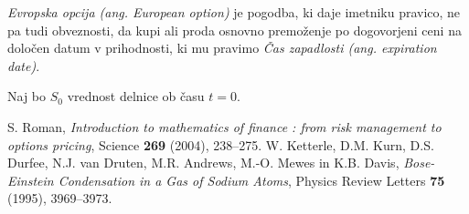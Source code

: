 \documentclass[twoside,11pt]{article}
\begin{document}
    \begin{definicija}
        \textit{Evropska opcija (ang. European option)} je pogodba, ki daje imetniku pravico, ne pa tudi obveznosti, da kupi ali proda osnovno premoženje po dogovorjeni ceni na določen datum v prihodnosti, ki mu pravimo \textit{Čas zapadlosti (ang. expiration date)}.
    \end{definicija}

    \begin{zgled}
        Naj bo $S_0$ vrednost delnice ob času $t=0$. 


    \end{zgled}

        












\begin{thebibliography}{99}

 S. Roman, \emph{Introduction to mathematics of finance : from risk management to options pricing}, Science \textbf{269} (2004), 238--275. 
 W. Ketterle, D.M. Kurn, D.S. Durfee, N.J. van Druten, M.R. Andrews, M.-O. Mewes in K.B. Davis, \emph{Bose-Einstein Condensation in a Gas of Sodium Atoms}, Physics Review Letters \textbf{75} (1995), 3969--3973. 


\end{thebibliography}
\end{document}
